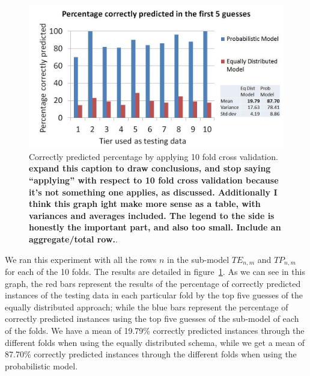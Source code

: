 \documentclass[conference]{IEEEtran}
\newcommand{\todo}[1]
  {{\scriptsize \textbf{\color{red} {#1}}}}
\begin{document}
{%


\begin{figure}[!h]
  \centering
    \includegraphics[scale=0.33]{sanity1}
  \caption{Correctly predicted percentage by applying 10 fold cross
    validation. \todo{expand this caption to draw conclusions, and stop saying ``applying'' with
      respect to 10 fold cross validation because it's not something one
      applies, as discussed.  Additionally I think this graph ight make more
      sense as a table, with variances and averages included.  The legend to the
      side is honestly the important part, and also too small.  Include an
      aggregate/total row.}.   }
  \label{fig:results10fcv}
\end{figure}

We ran this experiment with all the rows $n$ in the sub-model $TE_{n,m}$ and 
$TP_{n,m}$ for each of the 10 
folds. The results are detailed in figure~\ref{fig:results10fcv}. As we can see 
in this graph, the red bars represent the results of the percentage of correctly 
predicted instances of the testing data in each particular fold by the top five guesses of the equally distributed approach; while the blue 
bars represent the percentage of correctly predicted instances using the top five 
guesses of the sub-model of each of the folds. We have a mean of 19.79\% 
correctly predicted instances through the different folds when using the equally 
distributed schema, while we get a mean of 87.70\% correctly predicted instances 
through the different folds when using the probabilistic model. 

}
\end{document}
